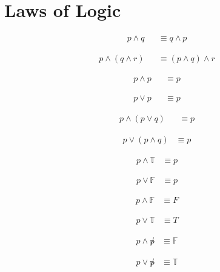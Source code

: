 \section{Laws of Logic}
\label{sec:LawsOfLogic}

\begin{align}
  p \land q & 
    & \equiv q \land p
  \label{eq:Commut}
\end{align}

\begin{align}
  p \land (q \land r) &
    & \equiv (p \land q) \land r
  \label{eq:Assoc}
\end{align}

\begin{align}
  p \land p &
    & \equiv p
  \label{eq:Idemp}
\end{align}

\begin{align}
  p \lor p &
    & \equiv p
  \label{eq:Idemp2}
\end{align}

\begin{align}
  p \land (p \lor q) &
    & \equiv p
  \label{eq:Distrib}
\end{align}

\begin{align}
  p \lor (p \land q) & \equiv p
  \label{eq:Distrib2}
\end{align}

\begin{align}
  p \land \mathbb{T} & \equiv p
  \label{eq:IdentAND}
\end{align}

\begin{align}
  p \lor \mathbb{F} & \equiv p
  \label{eq:IdentOR}
\end{align}

\begin{align}
  p \land \mathbb{F} & \equiv F
  \label{eq:Annihil}
\end{align}

\begin{align}
  p \lor \mathbb{T} & \equiv T
  \label{eq:Annihil2}
\end{align}

\begin{align}
  p \land \not p & \equiv \mathbb{F}
  \label{eq:Inv1}
\end{align}

\begin{align}
  p \lor \not p & \equiv \mathbb{T}
  \label{eq:Inv2}
\end{align}

